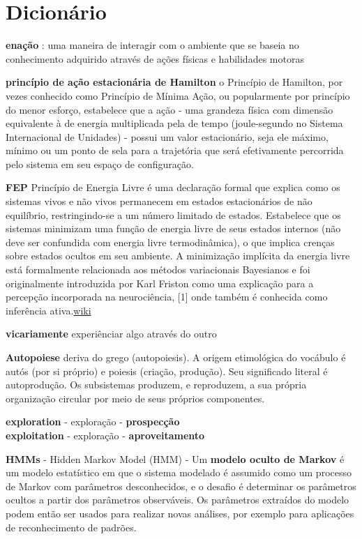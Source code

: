 \documentclass[
  12pt,
]{book}
\begin{document}
\cleardoublepage

\hypertarget{dicionuxe1rio}{%
\chapter*{Dicionário}\label{dicionuxe1rio}}

\textbf{enação} : uma maneira de interagir com o ambiente que se baseia no conhecimento adquirido através de ações físicas e habilidades motoras

\textbf{princípio de ação estacionária de Hamilton} o Princípio de Hamilton, por vezes conhecido como Princípio de Mínima Ação, ou popularmente por princípio do menor esforço, estabelece que a ação - uma grandeza física com dimensão equivalente à de energia multiplicada pela de tempo (joule-segundo no Sistema Internacional de Unidades) - possui um valor estacionário, seja ele máximo, mínimo ou um ponto de sela para a trajetória que será efetivamente percorrida pelo sistema em seu espaço de configuração.

\textbf{FEP} Princípio de Energia Livre é uma declaração formal que explica como os sistemas vivos e não vivos permanecem em estados estacionários de não equilíbrio, restringindo-se a um número limitado de estados. Estabelece que os sistemas minimizam uma função de energia livre de seus estados internos (não deve ser confundida com energia livre termodinâmica), o que implica crenças sobre estados ocultos em seu ambiente. A minimização implícita da energia livre está formalmente relacionada aos métodos variacionais Bayesianos e foi originalmente introduzida por Karl Friston como uma explicação para a percepção incorporada na neurociência, {[}1{]} onde também é conhecida como inferência ativa.\href{https://pt.wikipedia.org/wiki/Princ\%C3\%ADpio_da_energia_livre}{wiki}

\textbf{vicariamente} experiênciar algo através do outro

\textbf{Autopoiese} deriva do grego (autopoiesis). A origem etimológica do vocábulo é autós (por si próprio) e poiesis (criação, produção). Seu significado literal é autoprodução. Os subsistemas produzem, e reproduzem, a sua própria organização circular por meio de seus próprios componentes.

\textbf{exploration} - exploração - \textbf{prospecção}\\
\textbf{exploitation} - exploração - \textbf{aproveitamento}

\textbf{HMMs} - Hidden Markov Model (HMM) - Um \textbf{modelo oculto de Markov} é um modelo estatístico em que o sistema modelado é assumido como um processo de Markov com parâmetros desconhecidos, e o desafio é determinar os parâmetros ocultos a partir dos parâmetros observáveis. Os parâmetros extraídos do modelo podem então ser usados para realizar novas análises, por exemplo para aplicações de reconhecimento de padrões.
\end{document}
